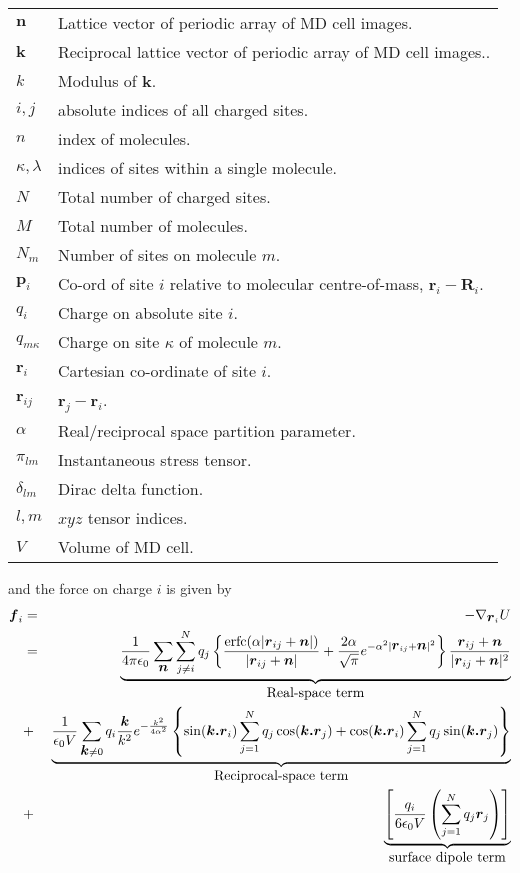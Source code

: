 \begin{tabular}{ll}
$\bm{n}$        & Lattice vector of periodic array of MD cell images. \\
$\bm{k}$        & Reciprocal lattice vector of periodic array of MD cell images.. \\
$k$             & Modulus of $\bm{k}$. \\
$i,j$           & absolute indices of all charged sites. \\
$n$             & index of molecules. \\
$\kappa,\lambda$ & indices of sites within a single molecule. \\
$N$             & Total number of charged sites. \\
$M$             & Total number of molecules. \\
$N_m$           & Number of sites on molecule $m$. \\
$\bm{p}_i$      & Co-ord of site $i$ relative to molecular 
centre-of-mass, $\bm{r}_i - \bm{R}_i$. \\
$q_i$           & Charge on absolute site $i$. \\
$q_{m\kappa}$   & Charge on site $\kappa$ of molecule $m$. \\
$\bm{r}_i$      & Cartesian co-ordinate of site $i$. \\
$\bm{r}_{ij}$   & $\bm{r}_j - \bm{r}_i$. \\
$\alpha$        & Real/reciprocal space partition parameter. \\
$\pi_{lm}$      & Instantaneous stress tensor. \\
$\delta_{lm}$   & Dirac delta function. \\
$l, m$          & $xyz$ tensor indices. \\
$V$             & Volume of MD cell.
\end{tabular}

and the force on charge $i$ is given by
\begin{eqnarray}
\label{eqn:ewald-force}
\mbox{\boldmath \protect\(f\protect\)}_i &=& - \nabla_{\mbox{\boldmath \protect\(r\protect\)}_i} U \nonumber \\
& = &  \underbrace{\frac{1}{4 \pi \epsilon_0}
\sum_{\mbox{\boldmath \protect\(n\protect\)}} \sum_{j \neq i}^{N} q_j \left \lbrace 
\frac{\mbox{erfc}( \alpha | \mbox{\boldmath \protect\(r\protect\)}_{ij} +  \mbox{\boldmath \protect\(n\protect\)} |)}{| \mbox{\boldmath \protect\(r\protect\)}_{ij} +\mbox{\boldmath \protect\(n\protect\)} | } +
\frac{2 \alpha}{\sqrt{\pi}}e^{- \alpha^2 | \mbox{\boldmath \protect\(r\protect\)}_{ij} +  \mbox{\boldmath \protect\(n\protect\)} |^2}
\right \rbrace \frac{\mbox{\boldmath \protect\(r\protect\)}_{ij} + \mbox{\boldmath \protect\(n\protect\)}}{| \mbox{\boldmath \protect\(r\protect\)}_{ij} + \mbox{\boldmath \protect\(n\protect\)} |^2}
}_{\mbox{Real-space term}} \nonumber \\
 & + & \underbrace{\frac{1}{\epsilon_0 V} 
\sum_{\mbox{\boldmath \protect\(k\protect\)} \ne 0} q_i \frac{\mbox{\boldmath \protect\(k\protect\)}}{k^2} e^{-\frac{k^2}{4 \alpha^2}} 
\left \lbrace 
\sin(\mbox{\boldmath \protect\(k.r\protect\)}_i) \sum_{j=1}^{N} q_j \cos(\mbox{\boldmath \protect\(k.r\protect\)}_j)  + 
\cos(\mbox{\boldmath \protect\(k.r\protect\)}_i) \sum_{j=1}^{N} q_j \sin(\mbox{\boldmath \protect\(k.r\protect\)}_j) 
\right \rbrace}_{\mbox{Reciprocal-space term}}\\ 
& + & \underbrace{\left [  \frac{q_i}{6 \epsilon_0 V} 
                    \left ( \sum_{j=1}^N q_j \mbox{\boldmath \protect\(r\protect\)}_j
                    \right ) \right ]}_{\mbox{surface dipole term}}
\nonumber
\end{eqnarray}

